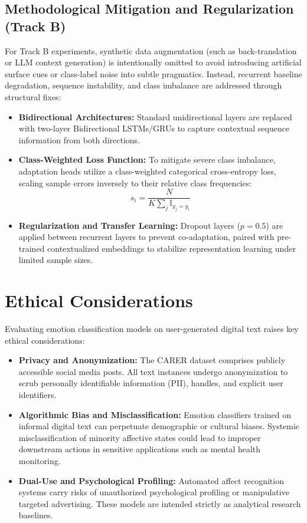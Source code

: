 \documentclass[conference]{IEEEtran}
\begin{document}
\subsection{Methodological Mitigation and Regularization (Track B)}
For Track B experiments, synthetic data augmentation (such as back-translation or LLM context generation) is intentionally omitted to avoid introducing artificial surface cues or class-label noise into subtle pragmatics. Instead, recurrent baseline degradation, sequence instability, and class imbalance are addressed through structural fixes:

\begin{itemize}
    \item \textbf{Bidirectional Architectures:} Standard unidirectional layers are replaced with two-layer Bidirectional LSTMs/GRUs to capture contextual sequence information from both directions.
    \item \textbf{Class-Weighted Loss Function:} To mitigate severe class imbalance, adaptation heads utilize a class-weighted categorical cross-entropy loss, scaling sample errors inversely to their relative class frequencies:
    \begin{equation}
        s_{i} = \frac{N}{K \sum_{j} \mathbb{I}_{y_{j}=y_{i}}}
    \end{equation}
    \item \textbf{Regularization and Transfer Learning:} Dropout layers ($p = 0.5$) are applied between recurrent layers to prevent co-adaptation, paired with pre-trained contextualized embeddings to stabilize representation learning under limited sample sizes.
\end{itemize}

\section{Ethical Considerations}
\label{sec:ethics}

Evaluating emotion classification models on user-generated digital text raises key ethical considerations:
\begin{itemize}
    \item \textbf{Privacy and Anonymization:} The CARER dataset comprises publicly accessible social media posts. All text instances undergo anonymization to scrub personally identifiable information (PII), handles, and explicit user identifiers.
    \item \textbf{Algorithmic Bias and Misclassification:} Emotion classifiers trained on informal digital text can perpetuate demographic or cultural biases. Systemic misclassification of minority affective states could lead to improper downstream actions in sensitive applications such as mental health monitoring.
    \item \textbf{Dual-Use and Psychological Profiling:} Automated affect recognition systems carry risks of unauthorized psychological profiling or manipulative targeted advertising. These models are intended strictly as analytical research baselines.
\end{itemize}
\end{document}
